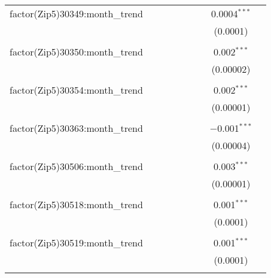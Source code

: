 \begin{table}[H]
{\begin{tabular}{@{\extracolsep{5pt}}lcccccccc}
  factor(Zip5)30349:month\_trend &  &  &  &  &  &  & 0.0004$^{***}$ &  \\  

   &  &  &  &  &  &  & (0.0001) &  \\  

   & & & & & & & & \\  

  factor(Zip5)30350:month\_trend &  &  &  &  &  &  & 0.002$^{***}$ &  \\  

   &  &  &  &  &  &  & (0.00002) &  \\  

   & & & & & & & & \\  

  factor(Zip5)30354:month\_trend &  &  &  &  &  &  & 0.002$^{***}$ &  \\  

   &  &  &  &  &  &  & (0.00001) &  \\  

   & & & & & & & & \\  

  factor(Zip5)30363:month\_trend &  &  &  &  &  &  & $-$0.001$^{***}$ &  \\  

   &  &  &  &  &  &  & (0.00004) &  \\  

   & & & & & & & & \\  

  factor(Zip5)30506:month\_trend &  &  &  &  &  &  & 0.003$^{***}$ &  \\  

   &  &  &  &  &  &  & (0.00001) &  \\  

   & & & & & & & & \\  

  factor(Zip5)30518:month\_trend &  &  &  &  &  &  & 0.001$^{***}$ &  \\  

   &  &  &  &  &  &  & (0.0001) &  \\  

   & & & & & & & & \\  

  factor(Zip5)30519:month\_trend &  &  &  &  &  &  & 0.001$^{***}$ &  \\  

   &  &  &  &  &  &  & (0.0001) &  \\  

   & & & & & & & & \\  


\end{tabular}}
\end{table}

